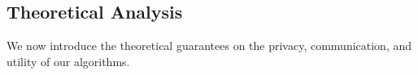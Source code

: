 
\subsection{Theoretical Analysis}
\label{chap2-sub:algorithms_theoretical_analysis}
We now introduce the theoretical guarantees on
the privacy, communication, and
utility of 
our algorithms. 

